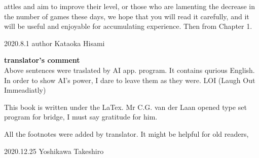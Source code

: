 attles and aim to improve their level, or those who are lamenting the decrease in the number of games these days, we hope that you will read it carefully, and it will be useful and enjoyable for accumulating experience. Then from Chapter 1.
\begin{flushright}
{2020.8.1 author Kataoka Hisami}
\end{flushright}


\vspace{1cm}
{\bf translator's comment}\\

Above sentences were traslated by AI app. program. It contains
qurious English. In order to show AI's power, I dare to leave them
as they were. LOI (Laugh Out Immeadiatly)

This book is written under the LaTex. Mr C.G. van der Laan opened
type set program for bridge, I must say gratitude for him.

All the footnotes were added by translator. It might be
helpful for old readers,
\begin{flushright}
{2020.12.25 Yoshikawa Takeshiro}
\end{flushright}


